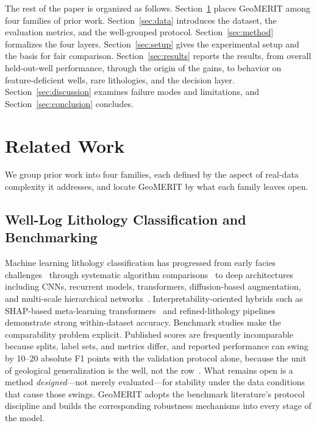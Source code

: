 \documentclass[bdcc,article,submit,pdftex,moreauthors]{Definitions/mdpi}
\begin{document}
The rest of the paper is organized as follows. Section~\ref{sec:related} places GeoMERIT among
four families of prior work. Section~\ref{sec:data} introduces the dataset, the evaluation
metrics, and the well-grouped protocol. Section~\ref{sec:method} formalizes the four layers.
Section~\ref{sec:setup} gives the experimental setup and the basis for fair comparison.
Section~\ref{sec:results} reports the results, from overall held-out-well performance, through
the origin of the gains, to behavior on feature-deficient wells, rare lithologies, and the
decision layer. Section~\ref{sec:discussion} examines failure modes and limitations, and
Section~\ref{sec:conclusion} concludes.

\section{Related Work}
\label{sec:related}
We group prior work into four families, each defined by the aspect of real-data complexity
it addresses, and locate GeoMERIT by what each family leaves open.

\subsection{Well-Log Lithology Classification and Benchmarking}
Machine learning lithology classification has progressed from early facies
challenges~\cite{hall2016facies} through systematic algorithm
comparisons~\cite{merembayev2021,dev2019formation} to deep architectures including CNNs,
recurrent models, transformers, diffusion-based augmentation, and multi-scale hierarchical
networks~\cite{wang2024dnnlitho,chen2025geological,zhao2025diffusion,zhan2025mchgeo}.
Interpretability-oriented hybrids such as SHAP-based meta-learning
transformers~\cite{sun2024shapmeta,lundberg2017shap} and refined-lithology
pipelines~\cite{shi2023refined} demonstrate strong within-dataset accuracy. Benchmark studies
make the comparability problem explicit. Published scores are frequently incomparable because
splits, label sets, and metrics differ, and reported performance can swing by 10--20 absolute
F1 points with the validation protocol alone, because the unit of geological generalization
is the well, not the row~\cite{carvalho2026benchmark,rosenblatt2024}. What remains open is a
method \emph{designed}---not merely evaluated---for stability under the data conditions that
cause those swings. GeoMERIT adopts the benchmark literature's protocol discipline and builds
the corresponding robustness mechanisms into every stage of the model.
\end{document}
